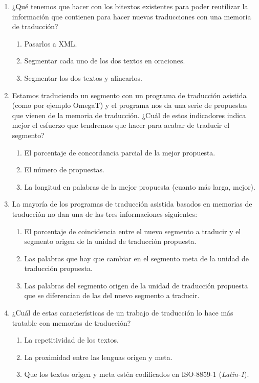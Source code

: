 \begin{enumerate}
\item ¿Qué tenemos que hacer con los bitextos existentes para poder reutilizar la información que contienen para hacer nuevas traducciones con una memoria de traducción? \begin{enumerate} \item Pasarlos a XML. \item Segmentar cada uno de los dos textos en oraciones. \item Segmentar los dos textos y alinearlos. \end{enumerate} 

\item Estamos traduciendo un segmento con un programa de traducción asistida (como por ejemplo OmegaT) y el programa nos da una serie de propuestas que vienen de la memoria de traducción. ¿Cuál de estos indicadores indica mejor el esfuerzo que tendremos que hacer para acabar de traducir el segmento? \begin{enumerate} \item El porcentaje de concordancia parcial de la mejor propuesta. \item El número de propuestas. \item La longitud en palabras de la mejor propuesta (cuanto más larga, mejor). \end{enumerate} 

\item La mayoría de los programas de traducción asistida basados en memorias de traducción no dan una de las tres informaciones siguientes: \begin{enumerate} 

\item El porcentaje de coincidencia entre el nuevo segmento a traducir y el segmento origen de la unidad de traducción propuesta. \item Las palabras que hay que cambiar en el segmento meta de la unidad de traducción propuesta. \item Las palabras del segmento origen de la unidad de traducción propuesta que se diferencian de las del nuevo segmento a traducir. \end{enumerate} 

\item ¿Cuál de estas características de un trabajo de traducción lo hace más tratable con memorias de traducción? \begin{enumerate} \item La repetitividad de los textos. \item La proximidad entre las lenguas origen y meta. \item Que los textos origen y meta estén codificados en ISO-8859-1 (\emph{Latin-1}). \end{enumerate} 


\end{enumerate}
